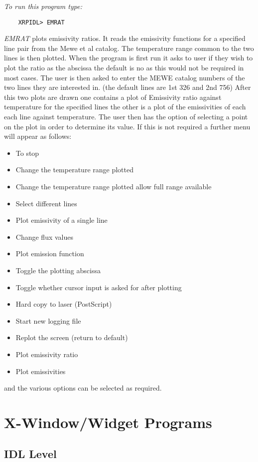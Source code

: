 {{{{\em To run this program type:}
\begin{verbatim}
    XRPIDL> EMRAT
\end{verbatim}
{\em EMRAT} plots emissivity ratios. It reads the emissivity functions for a
specified line pair from the Mewe et al catalog. The temperature range common to
the two lines is then plotted.
When the program is first run it asks to user if they wish to plot the ratio as
the abscissa the default is no as this would not be required in most cases.
The user is then asked to enter the MEWE catalog numbers of the two lines
they are interested in. (the default lines are 1st 326 and 2nd 756)
After this two plots are drawn one contains a plot of Emissivity ratio against
temperature for the specified lines the other is a plot of the emissivities of each
each line against temperature.
The user then has the option of selecting a point on the plot in order to
determine its value. If this is not required a further menu will appear as
follows:
\begin{itemize}
\item  To stop
\item  Change the temperature range plotted
\item  Change the temperature range plotted allow full range available
\item  Select different lines
\item  Plot emissivity of a single line
\item  Change flux values
\item  Plot emission function
\item  Toggle the plotting abscissa
\item  Toggle whether cursor input is asked for after plotting
\item  Hard copy to laser (PostScript)
\item  Start new logging file
\item  Replot the screen (return to default)
\item  Plot emissivity ratio
\item  Plot emissivities
\end{itemize}
and the various options can be selected as required.

\newpage

\section{X-Window/Widget Programs}

\subsection{IDL Level}

}}}
